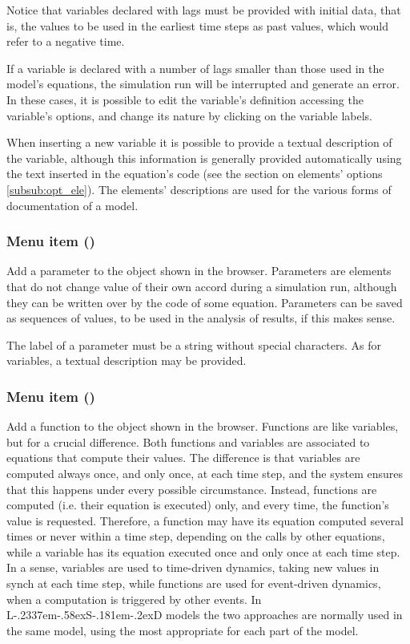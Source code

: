 \documentclass [11pt,a4paper] {book}
\def\LsD{{L\kern-.2337em\lower-.58ex\hbox{S}\kern-.181em\lower-.2ex\hbox{D}}\xspace}
\begin{document}
Notice that variables declared with lags must be provided with initial data, that is, the values to be used in the earliest time steps as past values, which would refer to a negative time.

If a variable is declared with a number of lags smaller than those used in the model's equations, the simulation run will be interrupted and generate an error. In these cases, it is possible to edit the variable's definition accessing the variable's options, and change its nature by clicking on the variable labels. 

When inserting a new variable it is possible to provide a textual description of the variable, although this information is generally provided automatically using the text inserted in the equation's code (see the section on elements' options \ref{subsub:opt_ele}). The elements' descriptions are used for the various forms of documentation of a model.


\subsubsection{Menu item  ()}

Add a parameter to the object shown in the browser. Parameters are elements that do not change value of their own accord during a simulation run, although they can be written over by the code of some equation. Parameters can be saved as sequences of values, to be used in the analysis of results, if this makes sense.

The label of a parameter must be a string without special characters. As for variables, a textual description may be provided.

\subsubsection{Menu item  ()}

Add a function to the object shown in the browser. Functions are like variables, but for a crucial difference. Both functions and variables are associated to equations that compute their values. The difference is that variables are computed always once, and only once, at each time step, and the system ensures that this happens under every possible circumstance. Instead, functions are computed (i.e. their equation is executed) only, and every time, the function's value is requested. Therefore, a function may have its equation computed several times or never within a time step, depending on the calls by other equations, while a variable has its equation executed once and only once at each time step. In a sense, variables are used to time-driven dynamics, taking new values in synch at each time step, while functions are used for event-driven dynamics, when a computation is triggered by other events. In \LsD models the two approaches are normally used in the same model, using the most appropriate for each part of the model.
\end{document}
